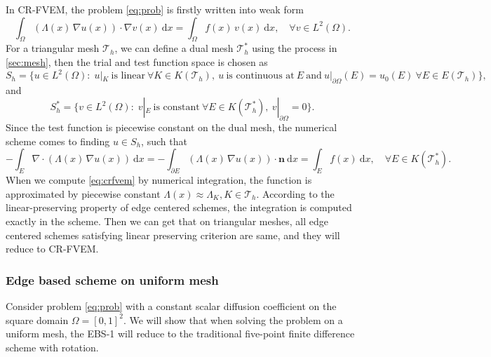 \documentclass[times,review,preprint,authoryear]{elsarticle}
\newcommand{\bn}{\mathbf{n}}
\begin{document}
In CR-FVEM, the problem \cref{eq:prob} is firstly written into weak form
\begin{equation*}
\int_{\Omega} (\Lambda(x) \, \nabla u(x)) \cdot \nabla v(x) \ \mathrm{d}x = \int_{\Omega} f(x) \, v(x) \ \mathrm{d}x, \quad \forall v \in L^2(\Omega).
\end{equation*}
For a triangular mesh $\mathcal{T}_h$, we can define a dual mesh $\mathcal{T}^*_h$ using the process in \cref{sec:mesh}, then the trial and test function space is chosen as
\begin{equation*}
S_h = \{u \in L^2(\Omega): \; u|_{K} \ \text{is linear} \ \forall K \in K(\mathcal{T}_h), \ u \ \text{is continuous at} \ E \ \text{and} \ u|_{\partial \Omega}(E) = u_0(E) \ \forall E \in E(\mathcal{T}_h)\},
\end{equation*}
and
\begin{equation*}
S^*_h = \{v \in L^2(\Omega): \; v|_{E} \ \text{is constant} \ \forall E \in K(\mathcal{T}^*_h), \ v|_{\partial \Omega} = 0\}.
\end{equation*}
Since the test function is piecewise constant on the dual mesh, the numerical scheme comes to finding $u \in S_h$, such that
\begin{equation}\label{eq:crfvem}
- \int_{E} \nabla \cdot (\Lambda(x) \, \nabla u(x)) \ \mathrm{d}x = - \int_{\partial E} (\Lambda(x) \, \nabla u(x)) \cdot \bn \ \mathrm{d}x = \int_{E} f(x) \ \mathrm{d}x, \quad \forall E \in K(\mathcal{T}^*_h).
\end{equation}
When we compute \cref{eq:crfvem} by numerical integration, the function is approximated by piecewise constant $\Lambda(x) \approx \Lambda_K, K \in \mathcal{T}_h$. According to the linear-preserving property of edge centered schemes, the integration is computed exactly in the scheme. Then we can get that on triangular meshes, all edge centered schemes satisfying linear preserving criterion are same, and they will reduce to CR-FVEM.

\subsubsection{Edge based scheme on uniform mesh}

Consider problem \cref{eq:prob} with a constant scalar diffusion coefficient on the square domain $\Omega = [0,1]^2$. We will show that when solving the problem on a uniform mesh, the EBS-1 will reduce to the traditional five-point finite difference scheme with rotation.

\end{document}
